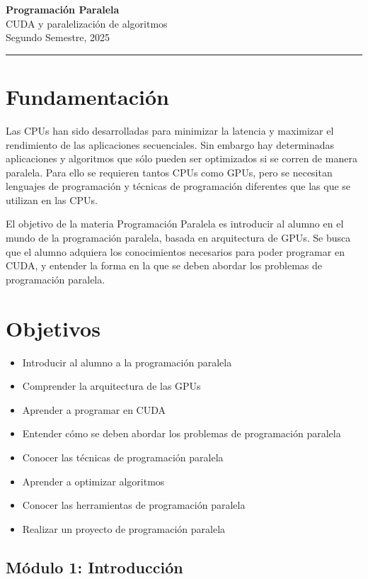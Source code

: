 



\begin{center}
    \LARGE\textbf{Programación Paralela} \\
    \Large{CUDA y paralelización de algoritmos} \\
    \normalsize{Segundo Semestre, 2025} \\
    \vspace{1em}
    \hrule
\end{center}

\vspace{1em}


\section*{Fundamentación}
Las CPUs han sido desarrolladas para minimizar la latencia y maximizar el rendimiento de las aplicaciones secuenciales.
Sin embargo hay determinadas aplicaciones y algoritmos que sólo pueden ser optimizados si se corren de manera paralela.
Para ello se requieren tantos CPUs como GPUs, pero se necesitan lenguajes de programación y técnicas de programación
diferentes que las que se utilizan en las CPUs.

El objetivo de la materia Programación Paralela es introducir al alumno en el mundo de la programación paralela, basada
en arquitectura de GPUs. Se busca que el alumno adquiera los conocimientos necesarios para poder programar en CUDA, y
entender la forma en la que se deben abordar los problemas de programación paralela.

\section*{Objetivos}
\begin {itemize}
  \item Introducir al alumno a la programación paralela
  \item Comprender la arquitectura de las GPUs
  \item Aprender a programar en CUDA
  \item Entender cómo se deben abordar los problemas de programación paralela
  \item Conocer las técnicas de programación paralela
  \item Aprender a optimizar algoritmos
  \item Conocer las herramientas de programación paralela
  \item Realizar un proyecto de programación paralela
\end {itemize}


\subsection{Módulo 1: Introducción}


